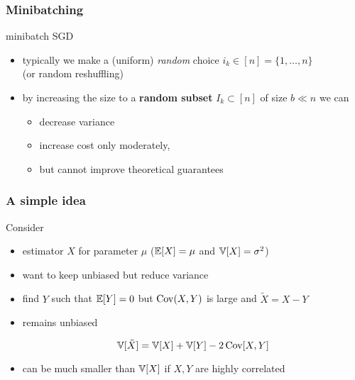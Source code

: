 \documentclass{beamer}
\begin{document}
\begin{frame}
  \frametitle{Minibatching}
  \begin{algorithm}[H]
    \caption{minibatch SGD}
    \begin{algorithmic}[1]
      \EndFor{}
    \end{algorithmic}
  \end{algorithm}
  \begin{itemize}
    \item typically we make a (uniform) \emph{random} choice $i_k \in [n] = \{1, \dots, n\}$\\
          (or random reshuffling)
    \item by increasing the size to a \textbf{random subset} $I_k \subset [n]$ of size $b \ll n$ we can
          \begin{itemize}
            \item decrease variance
            \item increase cost only moderately,
            \item but cannot improve theoretical guarantees
          \end{itemize}
  \end{itemize}

\end{frame}


\begin{frame}
  \frametitle{A simple idea}
  Consider
  \begin{itemize}
    \item estimator $X$ for parameter $\mu$ ($\mathbb{E}[X]=\mu$ and $\mathbb{V}[X]=\sigma^2$)
    \item want to keep unbiased but reduce variance
    \item find $Y$ such that $\mathbb{E}[Y] = 0$ but $\operatorname*{Cov} (X,Y)$ is large and $\tilde{X}=X-Y$
    \item remains unbiased

          \begin{equation}
            \mathbb{V}[\tilde{X}] = \mathbb{V}[X]+\mathbb{V}[Y]-2\operatorname*{Cov}[X,Y]
          \end{equation}
    \item can be much smaller than $\mathbb{V}[X]$ if $X,Y$ are highly correlated
  \end{itemize}
\end{frame}
\end{document}
